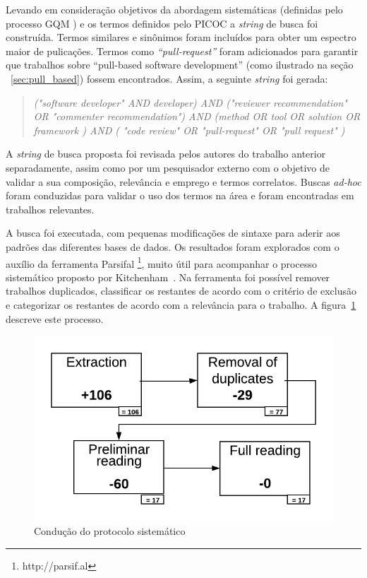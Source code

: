 \documentclass[12pt,openany,oneside,a4paper,english,brazil]{abntbibufjf}
\begin{document}
Levando em consideração objetivos da abordagem sistemáticas (definidas pelo processo GQM \cite{Basili1984}) e os termos definidos pelo PICOC \cite{Petticrew2008} a \textit{string} de busca foi construída. Termos similares e sinônimos foram incluídos para obter um espectro maior de pulicações. Termos como \textit{``pull-request''} foram adicionados para garantir que trabalhos sobre ``pull-based software development'' (como ilustrado na seção ~\ref{sec:pull_based}) fossem encontrados. Assim, a seguinte \textit{string} foi gerada:

\begin{quote}
  \textit{("software developer" AND developer)  AND  ("reviewer recommendation" OR "commenter recommendation")  AND  (method  OR  tool  OR  solution  OR  framework )  AND  ( "code review" OR "pull-request" OR "pull request" )}
\end{quote}

A \textit{string} de busca proposta foi revisada pelos autores do trabalho anterior separadamente, assim como por um pesquisador externo com o objetivo de validar a sua composição, relevância e emprego e termos correlatos. Buscas \textit{ad-hoc} foram conduzidas para validar o uso dos termos na área e foram encontradas em trabalhos relevantes.


A busca foi executada, com pequenas modificações de sintaxe para aderir aos padrões das diferentes bases de dados. Os resultados foram explorados com o auxílio da ferramenta Parsifal \footnote{http://parsif.al}, muito útil para acompanhar o processo sistemático proposto por Kitchenham~\cite{kitchenham2004}. Na ferramenta foi possível remover trabalhos duplicados, classificar os restantes de acordo com o critério de exclusão e categorizar os restantes de acordo com a relevância para o trabalho. A figura~\ref{fig:workflow} descreve este processo.

\begin{figure}[!htbp]
 \includegraphics[width=.5\textwidth]{workflow.png}
 \caption{Condução do protocolo sistemático}\label{fig:workflow}
\end{figure}
\end{document}
